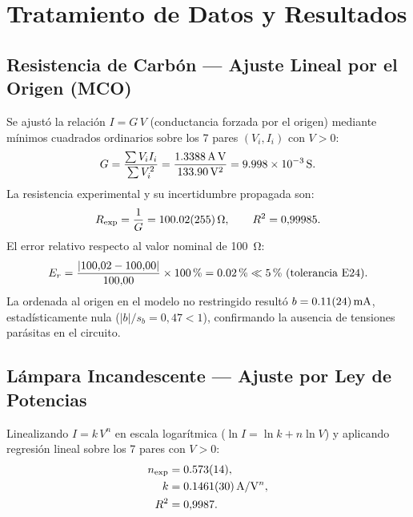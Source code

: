 
\section{Tratamiento de Datos y Resultados}
\label{sec:tratamiento}

\subsection{Resistencia de Carbón --- Ajuste Lineal por el Origen (MCO)}

Se ajustó la relación $I = G\,V$ (conductancia forzada por el origen) mediante mínimos cuadrados ordinarios sobre los 7 pares $(V_i, I_i)$ con $V > 0$:
\begin{equation}
    G = \frac{\sum V_i I_i}{\sum V_i^2} = \frac{\qty{1{,}3388}{\ampere\volt}}{\qty{133{,}90}{\volt^2}} = \qty{9{,}998e-3}{\siemens}.
\end{equation}
La resistencia experimental y su incertidumbre propagada son:
\begin{equation}
    R_{\text{exp}} = \frac{1}{G} = \qty{100{,}02 \pm 2{,}55}{\ohm}, \qquad R^2 = 0{,}99985.
\end{equation}
El error relativo respecto al valor nominal de \qty{100}{\ohm}:
\begin{equation}
    E_r = \frac{|100{,}02 - 100{,}00|}{100{,}00} \times \qty{100}{\percent} = \qty{0{,}02}{\percent} \ll \qty{5}{\percent}\ (\text{tolerancia E24}).
\end{equation}
La ordenada al origen en el modelo no restringido resultó $b = \qty{0{,}11 \pm 0{,}24}{\milli\ampere}$, estadísticamente nula ($|b|/s_b = 0{,}47 < 1$), confirmando la ausencia de tensiones parásitas en el circuito.

\subsection{Lámpara Incandescente --- Ajuste por Ley de Potencias}

Linealizando $I = k\,V^n$ en escala logarítmica ($\ln I = \ln k + n \ln V$) y aplicando regresión lineal sobre los 7 pares con $V > 0$:
\begin{align}
    n_{\text{exp}} &= \num{0{,}573 \pm 0{,}014}, \\
    k               &= \qty{0{,}1461 \pm 0{,}0030}{\ampere\per\volt^n}, \\
    R^2             &= 0{,}9987.
\end{align}

